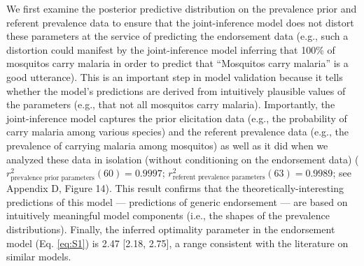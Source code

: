 \documentclass[english,,man,floatsintext]{apa6}
\theoremstyle{definition}
\theoremstyle{definition}
\theoremstyle{definition}
\theoremstyle{remark}
\begin{document}
We first examine the posterior predictive distribution on the prevalence
prior and referent prevalence data to ensure that the joint-inference
model does not distort these parameters at the service of predicting the
endorsement data (e.g., such a distortion could manifest by the
joint-inference model inferring that 100\% of mosquitos carry malaria in
order to predict that \enquote{Mosquitos carry malaria} is a good
utterance). This is an important step in model validation because it
tells whether the model's predictions are derived from intuitively
plausible values of the parameters (e.g., that not all mosquitos carry
malaria). Importantly, the joint-inference model captures the prior
elicitation data (e.g., the probability of carry malaria among various
species) and the referent prevalence data (e.g., the prevalence of
carrying malaria among mosquitos) as well as it did when we analyzed
these data in isolation (without conditioning on the endorsement data)
(\(r_{\text{prevalence prior parameters}}^2(60) = 0.9997\);
\(r_{\text{referent prevalence parameters}}^2(63) = 0.9989\); see
Appendix D, Figure 14). This result confirms that the
theoretically-interesting predictions of this model --- predictions of
generic endorsement --- are based on intuitively meaningful model
components (i.e., the shapes of the prevalence distributions). Finally,
the inferred optimality parameter in the endorsement model (Eq.
\ref{eq:S1}) is 2.47 {[}2.18, 2.75{]}, a range consistent with the
literature on similar models.
\end{document}
